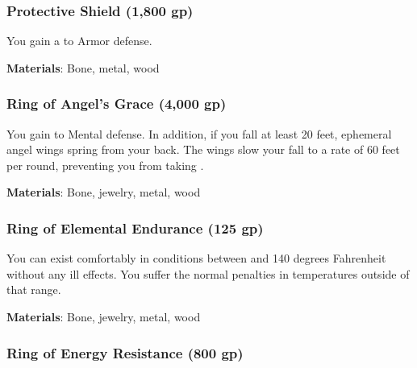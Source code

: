\lowercase{\hypertarget{item:Protective Shield}{}}\label{item:Protective Shield}
\hypertarget{item:Protective Shield}{\subsubsection{Protective Shield\hfill{} (1,800 gp)}}

You gain a   to Armor defense.



\vspace{0.25em}
\textbf{Materials}: Bone, metal, wood


\lowercase{\hypertarget{item:Ring of Angel's Grace}{}}\label{item:Ring of Angel's Grace}
\hypertarget{item:Ring of Angel's Grace}{\subsubsection{Ring of Angel's Grace\hfill{} (4,000 gp)}}

You gain   to Mental defense.
In addition, if you fall at least 20 feet, ephemeral angel wings spring from your back.
The wings slow your fall to a rate of 60 feet per round, preventing you from taking .



\vspace{0.25em}
\textbf{Materials}: Bone, jewelry, metal, wood


\lowercase{\hypertarget{item:Ring of Elemental Endurance}{}}\label{item:Ring of Elemental Endurance}
\hypertarget{item:Ring of Elemental Endurance}{\subsubsection{Ring of Elemental Endurance\hfill{} (125 gp)}}

You can exist comfortably in conditions between  and 140 degrees Fahrenheit without any ill effects.
You suffer the normal penalties in temperatures outside of that range.



\vspace{0.25em}
\textbf{Materials}: Bone, jewelry, metal, wood


\lowercase{\hypertarget{item:Ring of Energy Resistance}{}}\label{item:Ring of Energy Resistance}
\hypertarget{item:Ring of Energy Resistance}{\subsubsection{Ring of Energy Resistance\hfill{} (800 gp)}}

